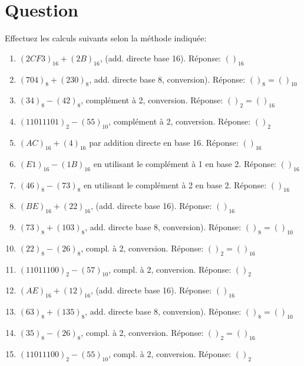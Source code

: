 \documentclass[letter, oneside]{book}
\begin{document}
\section*{Question}
\label{sec:orga6bb2c4}
Effectuez les calculs suivants selon la méthode indiquée:

\begin{enumerate}
\item \((2CF3)_{16} + (2B)_{16}\), (add. directe base 16). Réponse: \(( )_{16}\)

\item \((704)_{8} + (230)_{8}\), add. directe base 8, conversion). Réponse: \(( )_{8} = ( )_{10}\)

\item \((34)_{8} - (42)_{8}\), complément à 2, conversion. Réponse: \(( )_{2} = ( )_{16}\)

\item \((11011101)_{2} - (55)_{10}\), complément à 2, conversion. Réponse: \(( )_{2}\)

\item \((AC)_{16} + (4)_{16}\) par addition directe en base 16. Réponse: \(( )_{16}\)

\item \((E1)_{16} - (1B)_{16}\) en utilisant le complément à 1 en base 2. Réponse: \(( )_{16}\)

\item \((46)_{8} - (73)_{8}\) en utilisant le complément à 2 en base 2. Réponse: \(( )_{16}\)

\item \((BE)_{16} + (22)_{16}\), (add. directe base 16). Réponse: \(( )_{16}\)

\item \((73)_{8} + (103)_{8}\), add. directe base 8, conversion). Réponse: \(( )_{8} = ( )_{10}\)

\item \((22)_{8} - (26)_{8}\), compl. à 2, conversion. Réponse: \(( )_{2} = ( )_{16}\)

\item \((11011100)_{2} - (57)_{10}\), compl. à 2, conversion. Réponse: \(( )_{2}\)

\item \((AE)_{16} + (12)_{16}\), (add. directe base 16). Réponse: \(( )_{16}\)

\item \((63)_{8} + (135)_{8}\), add. directe base 8, conversion). Réponse: \(( )_{8} = ( )_{10}\)

\item \((35)_{8} - (26)_{8}\), compl. à 2, conversion. Réponse: \(( )_{2} = ( )_{16}\)

\item \((11011100)_{2} - (55)_{10}\), compl. à 2, conversion. Réponse: \(( )_{2}\)
\end{enumerate}
\end{document}
